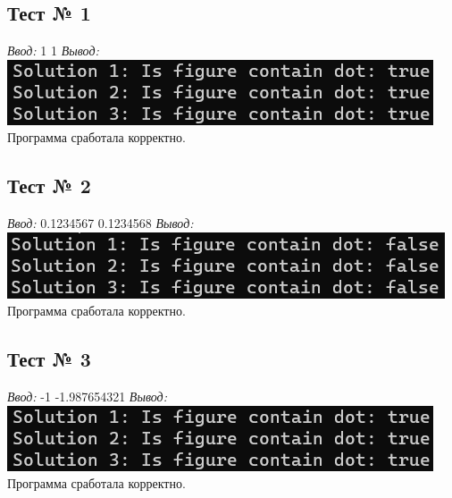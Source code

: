 \documentclass[12pt]{article}
\begin{document}
	\subsection*{Тест № 1}
	\textit{Ввод:} 1 1 \newline
	\textit{Вывод:}
	\vspace{6px}
	\newline
	\includegraphics{test_1}
	\vspace{3px}
	\newline
	Программа сработала корректно.
	
	\subsection*{Тест № 2}
	\textit{Ввод:} 0.1234567 0.1234568 \newline
	\textit{Вывод:}
	\vspace{6px}
	\newline
	\includegraphics{test_2}
	\vspace{3px}
	\newline
	Программа сработала корректно.
	
	\subsection*{Тест № 3}
	\textit{Ввод:} -1 -1.987654321 \newline
	\textit{Вывод:}
	\vspace{6px}
	\newline
	\includegraphics{test_3}
	\vspace{3px}
	\newline
	Программа сработала корректно.
	
	
	
\end{document}
